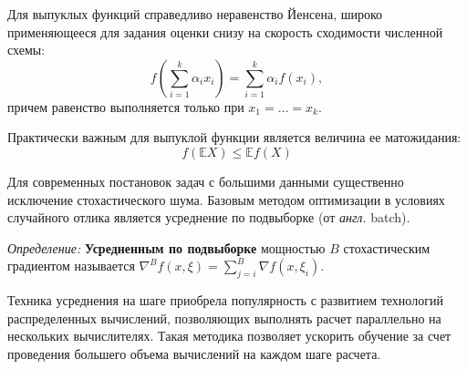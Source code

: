 Для выпуклых функций справедливо неравенство Йенсена, широко применяющееся для задания оценки снизу на скорость 
сходимости численной схемы:
\begin{equation}
    f \left( \sum_{i=1}^k \alpha_i x_i \right) = \sum_{i=1}^k \alpha_i f(x_i),
\end{equation}
причем равенство выполняется только при $x_1 = \dots =x_k$.

Практически важным для выпуклой функции является величина ее матожидания:
\begin{equation}
    f(\mathbb{E} X) \le \mathbb{E} f(X)
\end{equation}

Для современных постановок задач с большими данными существенно исключение стохастического шума. Базовым методом
оптимизации в условиях случайного отлика является усреднение по подвыборке (от \textit{англ.} batch). 

\textit{Определение:} \textbf{Усредненным по подвыборке} мощностью $B$ стохастическим градиентом называется 
$\nabla^B f(x,\xi) = \sum_{j=i}^B \nabla f(x,\xi_i)$.

Техника усреднения на шаге приобрела популярность с развитием технологий распределенных вычислений, позволяющих выполнять
расчет параллельно на нескольких вычислителях. Такая методика позволяет ускорить обучение за счет 
проведения большего объема вычислений на каждом шаге расчета.



